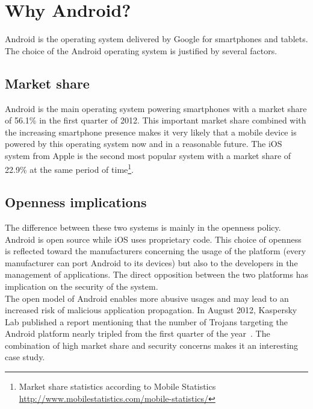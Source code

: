 \section*{Why Android?}
\label{sec:why-android}

Android is the operating system delivered by Google for smartphones and tablets.
The choice of the Android operating system is justified by several factors.\\

\subsection*{Market share}

Android is the main operating system powering smartphones with a market share of 56.1\% in the first quarter of 2012.
This important market share combined with the increasing smartphone presence makes it very likely that a mobile device is powered by this operating system now and in a reasonable future.
The iOS system from Apple is the second most popular system with a market share of 22.9\% at the same period of time\footnote{Market share statistics according to Mobile Statistics \url{http://www.mobilestatistics.com/mobile-statistics/}}.\\

\subsection*{Openness implications}
The difference between these two systems is mainly in the openness policy.
Android is open source while iOS uses proprietary code.
This choice of openness is reflected toward the manufacturers concerning the usage of the platform (every manufacturer can port Android to its devices) but also to the developers in the management of applications.
The direct opposition between the two platforms has implication on the security of the system.\\

The open model of Android enables more abusive usages and may lead to an increased risk of malicious application propagation.
In August 2012, Kaspersky Lab published a report mentioning that the number of Trojans targeting the Android platform nearly tripled from the first quarter of the year~\cite{kasperskymalware}.
The combination of high market share and security concerns makes it an interesting case study.\\

